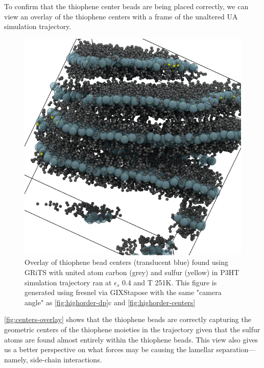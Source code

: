 To confirm that the thiophene center beads are being placed correctly, we can view an overlay of the thiophene centers with a frame of the unaltered UA simulation trajectory.
\begin{figure}
    \centering
    \includegraphics[width=0.8\linewidth]{figures/p3ht_val/cg-overlay_scene.png}
    \caption{Overlay of thiophene bead centers (translucent blue) found using GRiTS with united atom carbon (grey) and sulfur (yellow) in P3HT simulation trajectory ran at $\epsilon_{s}$ 0.4 and T 251K. This figure is generated using fresnel via GIXStapose with the same "camera angle" as \autoref{fig:highorder-dp}c and \autoref{fig:highorder-centers}}\label{fig:centers-overlay}
\end{figure}
\autoref{fig:centers-overlay} shows that the thiophene beads are correctly capturing the geometric centers of the thiophene moieties in the trajectory given that the sulfur atoms are found almost entirely within the thiophene beads. This view also gives us a better perspective on what forces may be causing the lamellar separation---namely, side-chain interactions.

